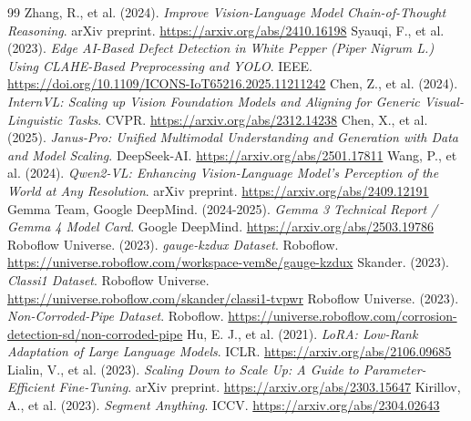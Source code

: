 \documentclass{article}
\begin{document}
\begin{thebibliography}{99}
 Zhang, R., et al. (2024). \textit{Improve Vision-Language Model Chain-of-Thought Reasoning}. arXiv preprint. \url{https://arxiv.org/abs/2410.16198}
 Syauqi, F., et al. (2023). \textit{Edge AI-Based Defect Detection in White Pepper (Piper Nigrum L.) Using CLAHE-Based Preprocessing and YOLO}. IEEE. \url{https://doi.org/10.1109/ICONS-IoT65216.2025.11211242}
 Chen, Z., et al. (2024). \textit{InternVL: Scaling up Vision Foundation Models and Aligning for Generic Visual-Linguistic Tasks}. CVPR. \url{https://arxiv.org/abs/2312.14238}
 Chen, X., et al. (2025). \textit{Janus-Pro: Unified Multimodal Understanding and Generation with Data and Model Scaling}. DeepSeek-AI. \url{https://arxiv.org/abs/2501.17811}
 Wang, P., et al. (2024). \textit{Qwen2-VL: Enhancing Vision-Language Model's Perception of the World at Any Resolution}. arXiv preprint. \url{https://arxiv.org/abs/2409.12191}
 Gemma Team, Google DeepMind. (2024-2025). \textit{Gemma 3 Technical Report / Gemma 4 Model Card}. Google DeepMind. \url{https://arxiv.org/abs/2503.19786}
 Roboflow Universe. (2023). \textit{gauge-kzdux Dataset}. Roboflow. \url{https://universe.roboflow.com/workspace-vem8e/gauge-kzdux}
 Skander. (2023). \textit{Classi1 Dataset}. Roboflow Universe. \url{https://universe.roboflow.com/skander/classi1-tvpwr}
 Roboflow Universe. (2023). \textit{Non-Corroded-Pipe Dataset}. Roboflow. \url{https://universe.roboflow.com/corrosion-detection-sd/non-corroded-pipe}
 Hu, E. J., et al. (2021). \textit{LoRA: Low-Rank Adaptation of Large Language Models}. ICLR. \url{https://arxiv.org/abs/2106.09685}
 Lialin, V., et al. (2023). \textit{Scaling Down to Scale Up: A Guide to Parameter-Efficient Fine-Tuning}. arXiv preprint. \url{https://arxiv.org/abs/2303.15647}
 Kirillov, A., et al. (2023). \textit{Segment Anything}. ICCV. \url{https://arxiv.org/abs/2304.02643}
\end{thebibliography}
\end{document}
